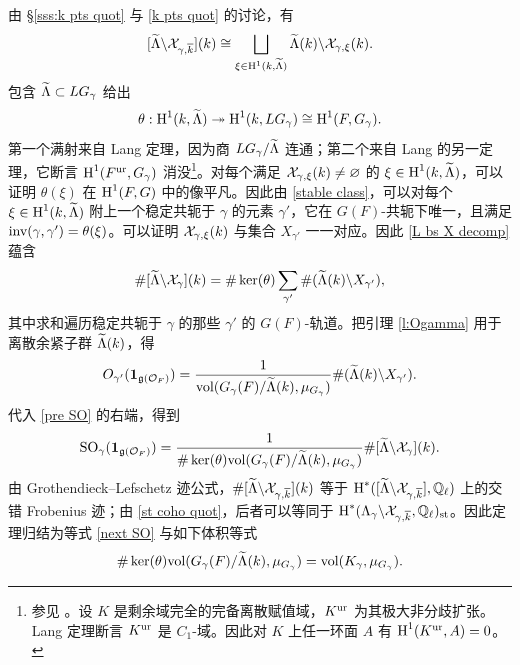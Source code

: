 由 \S\ref{sss:k pts quot} 与 \eqref{k pts quot} 的讨论，有
\begin{equation}\label{L bs X decomp}
[\widetilde{\Lambda}\backslash\mathcal{X}_{\gamma,\overline{k}}](k)\cong\bigsqcup_{\xi\in\textup{H}^{1}({k,\widetilde{\Lambda}})} \widetilde{\Lambda}(k)\backslash\mathcal{X}_{\gamma,\xi}(k).
\end{equation}
包含 $\widetilde{\Lambda}\subset LG_{\gamma}$ 给出
\begin{equation*}
\theta: \textup{H}^{1}({k,\widetilde{\Lambda}})\twoheadrightarrow\textup{H}^{1}({k,LG_{\gamma}})\cong\textup{H}^{1}({F, G_{\gamma}}).
\end{equation*}
第一个满射来自 Lang 定理，因为商 $LG_{\gamma}/\widetilde{\Lambda}$ 连通；第二个来自 Lang 的另一定理，它断言 $\textup{H}^{1}({F^{\textup{ur}}, G_{\gamma}})$ 消没\footnote{参见 \cite[Ch.X, \S7, p.170, Application and Example (b)]{Serre}。设 $K$ 是剩余域完全的完备离散赋值域，$K^{\textup{ur}}$ 为其极大非分歧扩张。Lang 定理断言 $K^{\textup{ur}}$ 是 $C_{1}$-域。因此对 $K$ 上任一环面 $A$ 有 $\textup{H}^{1}({K^{\textup{ur}}, A})=0$。}。对每个满足 $\mathcal{X}_{\gamma,\xi}(k)\neq\varnothing$ 的 $\xi\in\textup{H}^{1}({k,\widetilde{\Lambda}})$，可以证明 $\theta(\xi)$ 在 $\textup{H}^{1}({F,G})$ 中的像平凡。因此由 \eqref{stable class}，可以对每个 $\xi\in\textup{H}^{1}({k,\widetilde{\Lambda}})$ 附上一个稳定共轭于 $\gamma$ 的元素 $\gamma'$，它在 $G(F)$-共轭下唯一，且满足 $\textup{inv}(\gamma,\gamma')=\theta(\xi)$。可以证明 $\mathcal{X}_{\gamma,\xi}(k)$ 与集合 $X_{\gamma'}$ 一一对应。因此 \eqref{L bs X decomp} 蕴含
\begin{equation}\label{pre SO}
\#[\widetilde{\Lambda}\backslash\mathcal{X}_{\gamma}](k)=\#\ker(\theta)\sum_{\gamma'}\#(\widetilde{\Lambda}(k)\backslash X_{\gamma'}),
\end{equation}
其中求和遍历稳定共轭于 $\gamma$ 的那些 $\gamma'$ 的 $G(F)$-轨道。把引理 \ref{l:Ogamma} 用于离散余紧子群 $\widetilde{\Lambda}(k)$，得
\begin{equation*}
O_{\gamma'}(\mathbf{1}_{\mathfrak{g}(\mathcal{O}_{F})})=\frac{1}{\textup{vol}(G_{\gamma}(F)/\widetilde{\Lambda}(k),\mu_{G_{\gamma}})}\#(\widetilde{\Lambda}(k)\backslash X_{\gamma'}).
\end{equation*}
代入 \eqref{pre SO} 的右端，得到
\begin{equation}\label{next SO}
\textup{SO}_{\gamma}(\mathbf{1}_{\mathfrak{g}(\mathcal{O}_{F})})=\frac{1}{\#\ker(\theta)\textup{vol}(G_{\gamma}(F)/\widetilde{\Lambda}(k),\mu_{G_{\gamma}})}\#[\widetilde{\Lambda}\backslash\mathcal{X}_{\gamma}](k).
\end{equation}
由 Grothendieck--Lefschetz 迹公式，$\#[\widetilde{\Lambda}\backslash\mathcal{X}_{\gamma,\overline{k}}](k)$ 等于 $\textup{H}^{*}({[\widetilde{\Lambda}\backslash\mathcal{X}_{\gamma,\overline{k}}],\mathbb{Q}_{\ell}})$ 上的交错 Frobenius 迹；由 \eqref{st coho quot}，后者可以等同于 $\textup{H}^{*}({\Lambda_{\gamma}\backslash\mathcal{X}_{\gamma,\overline{k}},\mathbb{Q}_{\ell}})_{\textup{st}}$。因此定理归结为等式 \eqref{next SO} 与如下体积等式
\begin{equation}\label{vol id}
\#\ker(\theta)\textup{vol}(G_{\gamma}(F)/\widetilde{\Lambda}(k),\mu_{G_{\gamma}})=\textup{vol}(K_{\gamma},\mu_{G_{\gamma}}).
\end{equation}
